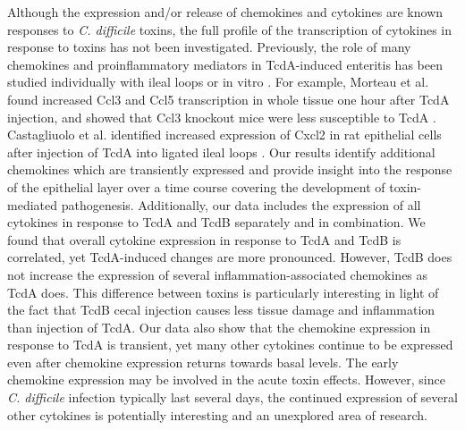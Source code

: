 Although the expression and/or release of chemokines and cytokines 
are known responses to \textit{C. difficile} toxins, the full profile 
of the transcription of cytokines in response to toxins has not 
been investigated. Previously, the role of many chemokines 
and proinflammatory mediators in TcdA-induced enteritis has 
been studied individually with ileal loops or in vitro \cite{Sun:2010kt}. 
For example, Morteau et al. found increased Ccl3 and Ccl5 
transcription in whole tissue one hour after TcdA injection, 
and showed that Ccl3 knockout mice were less susceptible 
to TcdA \cite{Morteau:2002ts}. Castagliuolo et al. 
identified increased expression of Cxcl2 in rat epithelial 
cells after injection of TcdA into ligated ileal loops 
\cite{Castagliuolo:1998um}. Our results identify additional 
chemokines which are transiently expressed and provide 
insight into the response of the epithelial layer over 
a time course covering the development of toxin-mediated 
pathogenesis. Additionally, our data includes the 
expression of all cytokines in response to TcdA and TcdB 
separately and in combination. We found that overall 
cytokine expression in response to TcdA and TcdB is 
correlated, yet TcdA-induced changes are more pronounced. 
However, TcdB does not increase the expression of several 
inflammation-associated chemokines as TcdA does. This 
difference between toxins is particularly interesting 
in light of the fact that TcdB cecal injection causes 
less tissue damage and inflammation than injection of 
TcdA. Our data also show that the chemokine expression 
in response to TcdA is transient, yet many other cytokines 
continue to be expressed even after chemokine expression 
returns towards basal levels. The early chemokine 
expression may be involved in the acute toxin effects. 
However, since \textit{C. difficile} infection typically 
last several days, the continued expression of several other 
cytokines is potentially interesting and an unexplored area 
of research.

